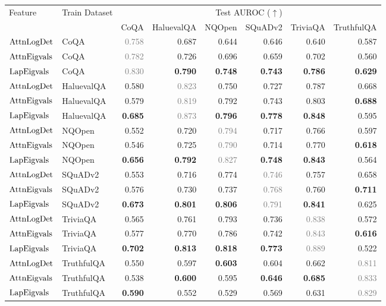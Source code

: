 \begin{tabular}{llrrrrrr}
\toprule
Feature & Train Dataset & \multicolumn{6}{c}{Test AUROC ($\uparrow$)} \\
\cmidrule(lr){3-8}
& & CoQA & HaluevalQA & NQOpen & SQuADv2 & TriviaQA & TruthfulQA \\
\midrule
$\operatorname{AttnLogDet}$ & CoQA & \textcolor{gray}{0.758} & 0.687 & 0.644 & 0.646 & 0.640 & 0.587 \\
$\operatorname{AttnEigvals}$ & CoQA & \textcolor{gray}{0.782} & 0.726 & 0.696 & 0.659 & 0.702 & 0.560 \\
$\operatorname{LapEigvals}$ & CoQA & \textcolor{gray}{0.830} & \textbf{0.790} & \textbf{0.748} & \textbf{0.743} & \textbf{0.786} & \textbf{0.629} \\
\midrule
$\operatorname{AttnLogDet}$ & HaluevalQA & 0.580 & \textcolor{gray}{0.823} & 0.750 & 0.727 & 0.787 & 0.668 \\
$\operatorname{AttnEigvals}$ & HaluevalQA & 0.579 & \textcolor{gray}{0.819} & 0.792 & 0.743 & 0.803 & \textbf{0.688} \\
$\operatorname{LapEigvals}$ & HaluevalQA & \textbf{0.685} & \textcolor{gray}{0.873} & \textbf{0.796} & \textbf{0.778} & \textbf{0.848} & 0.595 \\
\midrule
$\operatorname{AttnLogDet}$ & NQOpen & 0.552 & 0.720 & \textcolor{gray}{0.794} & 0.717 & 0.766 & 0.597 \\
$\operatorname{AttnEigvals}$ & NQOpen & 0.546 & 0.725 & \textcolor{gray}{0.790} & 0.714 & 0.770 & \textbf{0.618} \\
$\operatorname{LapEigvals}$ & NQOpen & \textbf{0.656} & \textbf{0.792} & \textcolor{gray}{0.827} & \textbf{0.748} & \textbf{0.843} & 0.564 \\
\midrule
$\operatorname{AttnLogDet}$ & SQuADv2 & 0.553 & 0.716 & 0.774 & \textcolor{gray}{0.746} & 0.757 & 0.658 \\
$\operatorname{AttnEigvals}$ & SQuADv2 & 0.576 & 0.730 & 0.737 & \textcolor{gray}{0.768} & 0.760 & \textbf{0.711} \\
$\operatorname{LapEigvals}$ & SQuADv2 & \textbf{0.673} & \textbf{0.801} & \textbf{0.806} & \textcolor{gray}{0.791} & \textbf{0.841} & 0.625 \\
\midrule
$\operatorname{AttnLogDet}$ & TriviaQA & 0.565 & 0.761 & 0.793 & 0.736 & \textcolor{gray}{0.838} & 0.572 \\
$\operatorname{AttnEigvals}$ & TriviaQA & 0.577 & 0.770 & 0.786 & 0.742 & \textcolor{gray}{0.843} & \textbf{0.616} \\
$\operatorname{LapEigvals}$ & TriviaQA & \textbf{0.702} & \textbf{0.813} & \textbf{0.818} & \textbf{0.773} & \textcolor{gray}{0.889} & 0.522 \\
\midrule
$\operatorname{AttnLogDet}$ & TruthfulQA & 0.550 & 0.597 & \textbf{0.603} & 0.604 & 0.662 & \textcolor{gray}{0.811} \\
$\operatorname{AttnEigvals}$ & TruthfulQA & 0.538 & \textbf{0.600} & 0.595 & \textbf{0.646} & \textbf{0.685} & \textcolor{gray}{0.833} \\
$\operatorname{LapEigvals}$ & TruthfulQA & \textbf{0.590} & 0.552 & 0.529 & 0.569 & 0.631 & \textcolor{gray}{0.829} \\
\bottomrule
\end{tabular}